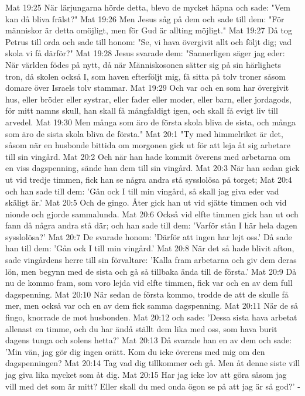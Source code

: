 Mat 19:25  När lärjungarna hörde detta, blevo de mycket häpna och sade: "Vem kan då bliva frälst?"
Mat 19:26  Men Jesus såg på dem och sade till dem: "För människor är detta omöjligt, men för Gud är allting möjligt."
Mat 19:27  Då tog Petrus till orda och sade till honom: "Se, vi hava övergivit allt och följt dig; vad skola vi få därför?"
Mat 19:28  Jesus svarade dem: "Sannerligen säger jag eder: När världen födes på nytt, då när Människosonen sätter sig på sin härlighets tron, då skolen också I, som haven efterföljt mig, få sitta på tolv troner såsom domare över Israels tolv stammar.
Mat 19:29  Och var och en som har övergivit hus, eller bröder eller systrar, eller fader eller moder, eller barn, eller jordagods, för mitt namns skull, han skall få mångfaldigt igen, och skall få evigt liv till arvedel.
Mat 19:30  Men många som äro de första skola bliva de sista, och många som äro de sista skola bliva de första."
Mat 20:1  "Ty med himmelriket är det, såsom när en husbonde bittida om morgonen gick ut för att leja åt sig arbetare till sin vingård.
Mat 20:2  Och när han hade kommit överens med arbetarna om en viss dagspenning, sände han dem till sin vingård.
Mat 20:3  När han sedan gick ut vid tredje timmen, fick han se några andra stå sysslolösa på torget;
Mat 20:4  och han sade till dem: 'Gån ock I till min vingård, så skall jag giva eder vad skäligt är.'
Mat 20:5  Och de gingo. Åter gick han ut vid sjätte timmen och vid nionde och gjorde sammalunda.
Mat 20:6  Också vid elfte timmen gick han ut och fann då några andra stå där; och han sade till dem: 'Varför stån I här hela dagen sysslolösa?'
Mat 20:7  De svarade honom: 'Därför att ingen har lejt oss.' Då sade han till dem: 'Gån ock I till min vingård.'
Mat 20:8  När det så hade blivit afton, sade vingårdens herre till sin förvaltare: 'Kalla fram arbetarna och giv dem deras lön, men begynn med de sista och gå så tillbaka ända till de första.'
Mat 20:9  Då nu de kommo fram, som voro lejda vid elfte timmen, fick var och en av dem full dagspenning.
Mat 20:10  När sedan de första kommo, trodde de att de skulle få mer, men också var och en av dem fick samma dagspenning.
Mat 20:11  När de så fingo, knorrade de mot husbonden.
Mat 20:12  och sade: 'Dessa sista hava arbetat allenast en timme, och du har ändå ställt dem lika med oss, som hava burit dagens tunga och solens hetta?'
Mat 20:13  Då svarade han en av dem och sade: 'Min vän, jag gör dig ingen orätt. Kom du icke överens med mig om den dagspenningen?
Mat 20:14  Tag vad dig tillkommer och gå. Men åt denne siste vill jag giva lika mycket som åt dig.
Mat 20:15  Har jag icke lov att göra såsom jag vill med det som är mitt? Eller skall du med onda ögon se på att jag är så god?' -

